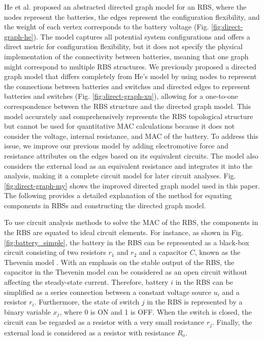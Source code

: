 \documentclass{article}
\begin{document}
He et al. \cite{heExploringAdaptiveReconfiguration2013} proposed an abstracted directed graph model for an RBS, where the nodes represent the batteries, the edges represent the configuration flexibility, and the weight of each vertex corresponds to the battery voltage (Fig. \ref{fig:direct-graph-he}). 
The model captures all potential system configurations and offers a direct metric for configuration flexibility, but it does not specify the physical implementation of the connectivity between batteries, meaning that one graph might correspond to multiple RBS structures.
We previously proposed a directed graph model that differs completely from He's model by using nodes to represent the connections between batteries and switches and directed edges to represent batteries and switches (Fig. \ref{fig:direct-graph-xu}), allowing for a one-to-one correspondence between the RBS structure and the directed graph model. 
This model accurately and comprehensively represents the RBS topological structure but cannot be used for quantitative MAC calculations because it does not consider  the voltage, internal resistance, and MAC of the battery. 
To address this issue, we improve our previous model by adding electromotive force and resistance attributes on the edges based on its equivalent circuits.
The model also considers the external load as an equivalent resistance and integrates it into the analysis, making it a complete circuit model for later circuit analyses.
Fig. \ref{fig:direct-graph-my} shows the improved directed graph model used in this paper.
The following  provides a detailed explanation of the method for equating components in RBSs and constructing the directed graph model.


To use circuit analysis methods to solve the MAC of the RBS, the components in the RBS are equated to ideal circuit elements.
For instance, as shown in Fig. \ref{fig:battery_simple}, the battery in the RBS can be represented as a black-box circuit consisting of two resistors $r_1$ and $r_2$ and a capacitor  $C$, known as the Thevenin model \cite{hongwenheStateofChargeEstimationLithiumIon2011,mousavig.VariousBatteryModels2014}.
With an emphasis on the stable output of the RBS, the capacitor in the Thevenin model can be considered as an open circuit without affecting the steady-state current.
Therefore,  battery $i$ in the RBS can be simplified as a series connection between a constant voltage source $u_{i}$ and a resistor $r_{i}$.
Furthermore, the state of switch $j$ in the RBS is represented by a binary variable $x_j$, where 0 is ON and 1 is OFF.
When the switch is closed, the circuit can be regarded as a resistor with a very small resistance $r_{j}$.
Finally, the external load is considered as a resistor with resistance $R_o$.
\end{document}

